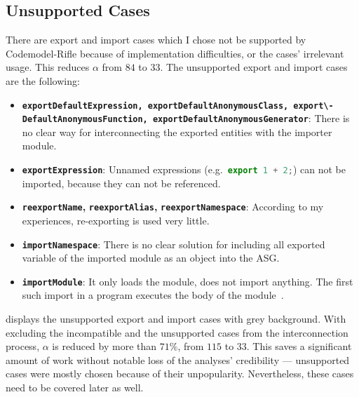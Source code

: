 \subsection{Unsupported Cases}

There are export and import cases which I chose not be supported by Codemodel-Rifle because of implementation difficulties, or the cases' irrelevant usage. This reduces $\alpha$ from $84$ to $33$. The unsupported export and import cases are the following:

\begin{itemize}
\item \textbf{\lstinline{exportDefaultExpression, exportDefaultAnonymousClass, export\- DefaultAnonymousFunction, exportDefaultAnonymousGenerator}}: There is no clear way for interconnecting the exported entities with the importer module.
\item \textbf{\lstinline{exportExpression}}: Unnamed expressions (e.g.\ \lstinline[language=JavaScript]{export 1 + 2;}) can not be imported, because they can not be referenced.
\item \textbf{\lstinline{reexportName},} \textbf{\lstinline{reexportAlias},} \textbf{\lstinline{reexportNamespace}}: According to my experiences, re-exporting is used very little.
\item \textbf{\lstinline{importNamespace}}: There is no clear solution for including all exported variable of the imported module as an object into the ASG.
\item \textbf{\lstinline{importModule}}: It only loads the module, does not import anything. The first such import in a program executes the body of the module~\cite{exploringes6}.
\end{itemize}

 displays the unsupported export and import cases with grey background. With excluding the incompatible and the unsupported cases from the interconnection process, $\alpha$ is reduced by more than $71\%$, from $115$ to $33$. This saves a significant amount of work without notable loss of the analyses' credibility — unsupported cases were mostly chosen because of their unpopularity. Nevertheless, these cases need to be covered later as well.

